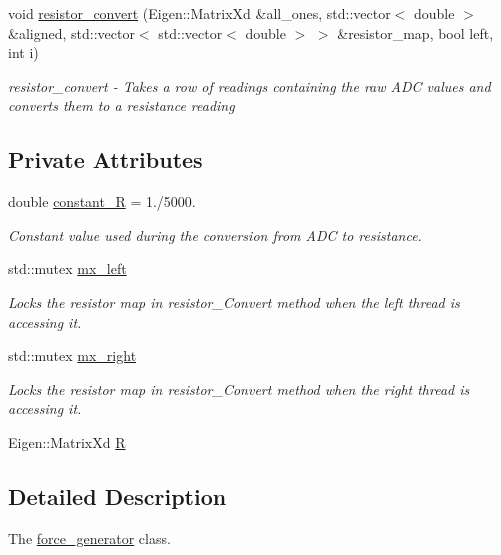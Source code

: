 \begin{DoxyCompactItemize}
void \hyperlink{classforce__generator_a6cd7bb94aa853b157fce7e58af33d597}{resistor\-\_\-convert} (Eigen\-::\-Matrix\-Xd \&all\-\_\-ones, std\-::vector$<$ double $>$ \&aligned, std\-::vector$<$ std\-::vector$<$ double $>$ $>$ \&resistor\-\_\-map, bool left, int i)
\begin{DoxyCompactList}\small\item\em resistor\-\_\-convert -\/ Takes a row of readings containing the raw A\-D\-C values and converts them to a resistance reading \end{DoxyCompactList}\end{DoxyCompactItemize}
\subsection*{Private Attributes}
\begin{DoxyCompactItemize}
\item 
double \hyperlink{classforce__generator_a8d86f29fb8d7435bc67c833ebea9579d}{constant\-\_\-\-R} = 1./5000.
\begin{DoxyCompactList}\small\item\em Constant value used during the conversion from A\-D\-C to resistance. \end{DoxyCompactList}\item 
std\-::mutex \hyperlink{classforce__generator_ab86abf71ba8319645ab92accd1f80a99}{mx\-\_\-left}
\begin{DoxyCompactList}\small\item\em Locks the resistor map in resistor\-\_\-\-Convert method when the left thread is accessing it. \end{DoxyCompactList}\item 
std\-::mutex \hyperlink{classforce__generator_a3f70de55db80a2e7ec683cf9605e2015}{mx\-\_\-right}
\begin{DoxyCompactList}\small\item\em Locks the resistor map in resistor\-\_\-\-Convert method when the right thread is accessing it. \end{DoxyCompactList}\item 
Eigen\-::\-Matrix\-Xd \hyperlink{classforce__generator_a6e529fccfe5e577bcd0dc3e017ece70c}{R}
\end{DoxyCompactItemize}


\subsection{Detailed Description}
The \hyperlink{classforce__generator}{force\-\_\-generator} class. 

